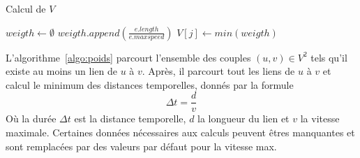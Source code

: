 \begin{algorithm}
\caption{Calcul de $V$}\label{algo:poids}
\begin{algorithmic}
			\State $weigth \gets \emptyset$
				\State $weigth.append\left(\frac{e.length}{e.maxspeed}\right)$
			\EndFor
			\State $V[j]\gets min(weigth)$
		\EndFor
	\EndFor
\end{algorithmic}
\end{algorithm}

L'algorithme~\ref{algo:poids} parcourt l'ensemble des couples $(u,v)\in V^2$ tels qu'il existe au moins un lien de $u$ à $v$. %
	Après, il parcourt tout les liens de $u$ à $v$ et calcul le minimum des distances temporelles, donnés par la formule
	\[\Delta t=\frac{d}{v}\]
	Où la durée $\Delta t$ est la distance temporelle, $d$ la longueur du lien et $v$ la vitesse maximale.
Certaines données nécessaires aux calculs peuvent êtres manquantes et sont remplacées par des valeurs par défaut pour la vitesse max. %